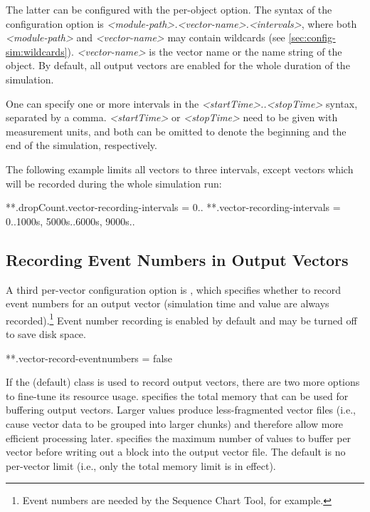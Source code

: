 The latter can be configured with the 
per-object option. The syntax of the configuration option is
\textit{<module-path>.<vector-name>.}\textit{<intervals>},
where both \textit{<module-path>} and \textit{<vector-name>} may contain
wildcards (see \ref{sec:config-sim:wildcards}). \textit{<vector-name>} is the
vector name or the name string of the  object. By default, all
output vectors are enabled for the whole duration of the simulation.

One can specify one or more intervals in the \textit{<startTime>..<stopTime>}
syntax, separated by a comma. \textit{<startTime>} or \textit{<stopTime>} need
to be given with measurement units, and both can be omitted to denote the
beginning and the end of the simulation, respectively.

The following example limits all vectors to three intervals, except
 vectors which will be recorded during the whole simulation run:

\begin{inifile}
**.dropCount.vector-recording-intervals = 0..
**.vector-recording-intervals = 0..1000s, 5000s..6000s, 9000s..
\end{inifile}

\subsection{Recording Event Numbers in Output Vectors}
\label{sec:ana-sim:vector-eventnum-recording}

A third per-vector configuration option is ,
which specifies whether to record event numbers for an output vector (simulation
time and value are always recorded).\footnote{Event numbers are needed
by the Sequence Chart Tool, for example.} Event number recording is enabled by
default and may be turned off to save disk space.

\begin{inifile}
**.vector-record-eventnumbers = false
\end{inifile}

If the (default)  class is used to
record output vectors, there are two more options to fine-tune its resource
usage.  specifies the total memory that can be
used for buffering output vectors. Larger values produce less-fragmented vector
files (i.e., cause vector data to be grouped into larger chunks) and therefore
allow more efficient processing later. 
specifies the maximum number of values to buffer per vector before writing out a
block into the output vector file. The default is no per-vector limit (i.e.,
only the total memory limit is in effect).

